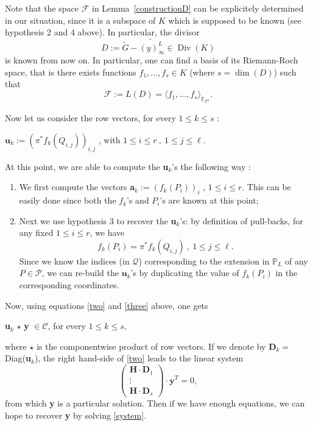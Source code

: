 \documentclass[10pt]{article}
\theoremstyle{definition}
\theoremstyle{definition}
\theoremstyle{definition}
\newcommand{\s}{\vspace{0.3cm}}
\newcommand{\cd}{\cdot}
\newcommand{\PP}{\mathbb{P}}
\newcommand{\fqm}{\mathbb{F}_{q^m}}
\newcommand{\PR}{\mathcal{P}}
\newcommand{\QR}{\mathcal{Q}}
\newcommand{\Div}{\operatorname{Div}}
\begin{document}
\s

Note that the space $\mathcal{F}$ in Lemma~\ref{constructionD} can be explicitely determined in our situation, since it is a subspace of $K$ which is supposed to be known (see hypothesis 2 and 4 above). In particular, the divisor 
\begin{equation} \label{four}
D := \tilde{G} - \widetilde{(y)^L_{\infty}} \in \Div(K)
\end{equation}
is known from now on. In particular, one can find a basis of its Riemann-Roch space, that is there exists functions $f_1,...,f_s \in K$ (where $s=\dim( D)$) such that 
\[\mathcal{F} := L(D) = \langle f_1,...,f_s \rangle_{\fqm}.\]

Now let us consider the row vectors, for every $1 \leq k \leq s$ :
\begin{center}
$\mathbf{u}_{k}:= \left(\pi^*f_k(Q_{i,j})\right)_{i,j}$ , with $1 \leq i \leq r \ , \ 1 \leq j \leq \ell$.
\end{center}

At this point, we are able to compute the \textbf{u}$_{k}$'s the following way :
\begin{enumerate}
\item We first compute the vectors \textbf{a}$_{k} := (f_k(P_i))_i$ , $1 \leq i \leq r$. This can be easily done since both the $f_k$'s and $P_i$'s are known at this point;
\item Next we use hypothesis $3$ to recover the \textbf{u}$_{k}$'s: by definition of pull-backs, for any fixed $1 \leq i \leq r$, we have 
\[f_k(P_i) = \pi^*f_k(Q_{i,j}) \ , \ 1 \leq j \leq \ell.\]
Since we know the indices (in $\QR$) corresponding to the extension in $\PP_L$ of any $P \in \PR$, we can re-build the $\mathbf{u}_{k}$'s by duplicating the value of $f_k(P_i)$ in the corresponding coordinates.
\end{enumerate}

Now, using equations \eqref{two} and \eqref{three} above, one gets 
\begin{center}
\textbf{u}$_{k}$ $\star$ \textbf{y} $\in \mathcal{C}$, for every $1 \leq k \leq s,$ 
\end{center}
where $\star$ is the componentwise product of row vectors.
If we denote by \textbf{D}$_{k} = $ Diag(\textbf{u}$_{k}$), the right hand-side of \eqref{two} leads to the linear system 
\begin{equation} \label{system}
\begin{pmatrix}
\mathbf{H} \cd \textbf{D}_1 \\
\vdots \\
\mathbf{H} \cd \textbf{D}_s
\end{pmatrix}
\cd \textbf{y}^T = 0, 
\end{equation}
from which \textbf{y} is a particular solution.
Then if we have enough equations, we can hope to recover \textbf{y} by solving \eqref{system}. 
\end{document}
